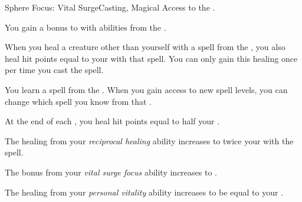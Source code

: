     \begin{feat}{Sphere Focus: Vital Surge}{Casting, Magical}
        \featpre Access to the  .

         You gain a  bonus to  with abilities from the  .

         When you heal a creature other than yourself with a spell from the  , you also heal hit points equal to your  with that spell.
        You can only gain this healing once per time you cast the spell.

         You learn a spell from the  .
        When you gain access to new spell levels, you can change which spell you know from that .

         At the end of each , you heal hit points equal to half your .

         The healing from your \textit{reciprocal healing} ability increases to twice your  with the spell.

         The bonus from your \textit{vital surge focus} ability increases to .

         The healing from your \textit{personal vitality} ability increases to be equal to your .
    \end{feat}

